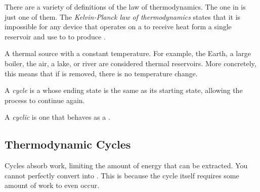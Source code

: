 \begin{definition}\label{def:Kelvin_Planck-2nd_Law_Thermo}
  There are a variety of definitions of the  law of thermodynamics.
  The one in  is just one of them.
  The \emph{Kelvin-Planck  law of thermodynamics} states that it is impossible for any device that operates on a  to receive heat form a single reservoir and use to to produce .

  \begin{remark}\label{rmk:Thermal_Reservoir}
    A thermal source with a constant temperature.
    For example, the Earth, a large boiler, the air, a lake, or river are considered thermal reservoirs.
    More concretely, this means that if  is removed, there is no temperature change.
  \end{remark}
\end{definition}

\begin{definition}[Cycle]\label{def:Cycle}
  A \emph{cycle} is a  whose ending state is the same as its starting state, allowing the process to continue again.

  \begin{remark}[Cyclic]\label{rmk:Cyclic}
    A \emph{cyclic}  is one that behaves as a .
  \end{remark}
\end{definition}

\subsection{Thermodynamic Cycles}\label{subsec:Thermodynamic_Cycles}
Cycles absorb work, limiting the amount of energy that can be extracted.
You cannot perfectly convert  into .
This is because the cycle itself requires some amount of work to even occur.

